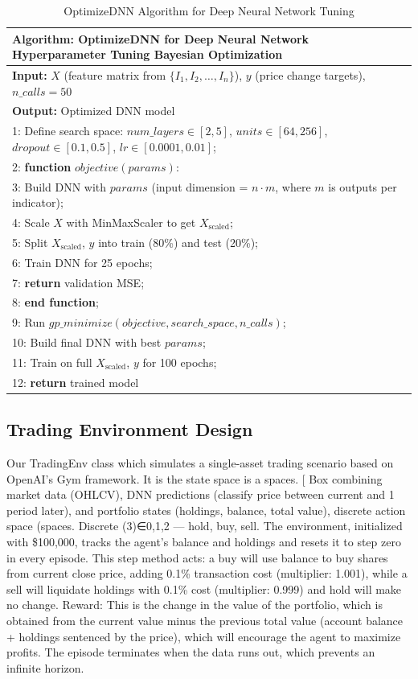 \begin{table}[h]
\small
\centering
\begin{tabular}{|p{14cm}|}
\hline
\textbf{Algorithm: OptimizeDNN for Deep Neural Network Hyperparameter Tuning Bayesian Optimization} \\
\hline
\textbf{Input:} \( X \) (feature matrix from \( \{I_1, I_2, \ldots, I_n\} \)), \( y \) (price change targets), \( n\_calls=50 \) \\
\textbf{Output:} Optimized DNN model \\
\hline
1: Define search space: $num\_layers \in [2, 5]$, $units \in [64, 256]$, $dropout \in [0.1, 0.5]$, $lr \in [0.0001, 0.01]$; \\
2: \textbf{function} $objective(params)$: \\
3: \quad Build DNN with $params$ (input dimension = $n \cdot m$, where $m$ is outputs per indicator); \\
4: \quad Scale $X$ with MinMaxScaler to get $X_{\text{scaled}}$; \\
5: \quad Split $X_{\text{scaled}}$, $y$ into train (80\%) and test (20\%); \\
6: \quad Train DNN for 25 epochs; \\
7: \quad \textbf{return} validation MSE; \\
8: \textbf{end function}; \\
9: Run $gp\_minimize(objective, search\_space, n\_calls)$; \\
10: Build final DNN with best $params$; \\
11: Train on full $X_{\text{scaled}}$, $y$ for 100 epochs; \\
12: \textbf{return} trained model \\
\hline
\end{tabular}
\caption{OptimizeDNN Algorithm for Deep Neural Network Tuning}
\label{tab:optimizednn_algorithm}
\end{table}


\subsection{Trading Environment Design}
Our TradingEnv class which simulates a single-asset trading scenario based on OpenAI’s Gym framework. It is the state space is a spaces. [ Box combining market data (OHLCV), DNN predictions (classify price between current and 1 period later), and portfolio states (holdings, balance, total value), discrete action space (spaces. Discrete (3)∈{0,1,2} — hold, buy, sell. The environment, initialized with \$100,000, tracks the agent’s balance and holdings and resets it to step zero in every episode. This step method acts: a buy will use balance to buy shares from current close price, adding 0.1\% transaction cost (multiplier: 1.001), while a sell will liquidate holdings with 0.1\% cost (multiplier: 0.999) and hold will make no change. Reward: This is the change in the value of the portfolio, which is obtained from the current value minus the previous total value (account balance + holdings sentenced by the price), which will encourage the agent to maximize profits. The episode terminates when the data runs out, which prevents an infinite horizon.

